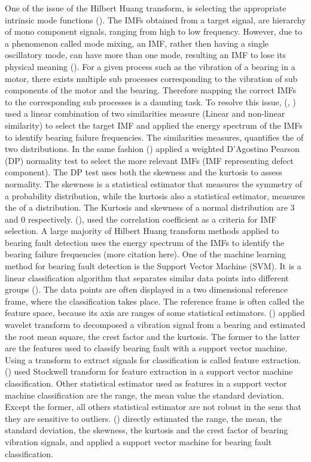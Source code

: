 \documentclass[../Main/thesis.tex]{subfiles}
\begin{document}
\justify
One of the issue of the Hilbert Huang transform, is selecting the appropriate intrinsic mode functions (\cite{fosso2019}). The IMFs obtained from a target signal, are hierarchy of mono component signals, ranging from high to low frequency. However, due to a phenomenon called mode mixing, an IMF, rather then having a single oscillatory mode, can have more than one mode, resulting an IMF to lose its physical meaning (\cite{fosso2019}). For a given process such as the vibration of a bearing in a motor, there exists multiple sub processes corresponding to the vibration of sub components of the motor and the bearing. Therefore mapping the correct IMFs to the corresponding sub processes is a daunting task.
\justify
 To resolve this issue, (\cite{osman2013a}, \cite{osman2013b} ) used a linear combination of two similarities measure (Linear and non-linear similarity) to select the target IMF and applied the energy spectrum of the IMFs to identify bearing failure frequencies. The similarities measures, quantifies the  of two distributions.
In the same fashion (\cite{osman2014}) applied a weighted D'Agostino Pearson (DP) normality test to select the more relevant IMFs (IMF representing defect component). The DP test uses both the skewness and the kurtosis to assess normality.
The skewness is a statistical estimator that measures the symmetry of a probability distribution, while the kurtosis also a statistical estimator, measures the  of a distribution. The Kurtosis and skewness of a normal distribution are 3 and 0 respectively. (\cite{peng2004}), used the correlation coefficient as a criteria for IMF selection.
\justify
A large majority of Hilbert Huang transform methods applied to bearing fault detection uses the energy spectrum of the IMFs to identify the bearing failure frequencies (more citation here).
\justify
One of the machine learning method for bearing fault detection is the Support Vector Machine (SVM). It is a linear classification algorithm that separates similar data points into different groups (\cite{vapnik1995}). The data points are  often displayed in a two dimensional reference frame, where the classification takes place. The reference frame is often called the feature space, because its axis are ranges of some statistical estimators. (\cite{konar2011}) applied wavelet transform to decomposed a vibration signal from a bearing and estimated the root mean square, the crest factor and the kurtosis. The former to the latter are the features used to classify bearing fault with a support vector machine. Using a transform to extract signals for classification is called feature extraction. (\cite{singh2018}) used Stockwell transform for feature extraction in a support vector machine classification. Other statistical estimator used as features in a support vector machine classification are the range, the mean value the standard deviation. Except the former, all others statistical estimator are not robust in the sens that they are sensitive to outliers. (\cite{kankar2010}) directly estimated the range, the mean, the standard deviation, the skewness, the kurtosis and the crest factor of bearing vibration signals, and applied a support vector machine for bearing fault classification.
\end{document}
